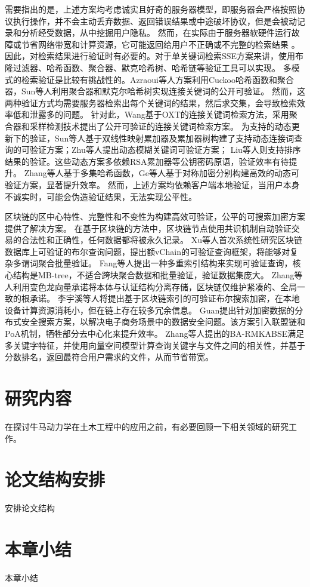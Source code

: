 需要指出的是，上述方案均考虑诚实且好奇的服务器模型，即服务器会严格按照协议执行操作，并不会主动丢弃数据、返回错误结果或中途破坏协议，但是会被动记录和分析经受数据，从中挖掘用户隐私。
然而，在实际由于服务器软硬件运行故障或节省网络带宽和计算资源，它可能返回给用户不正确或不完整的检索结果
。因此，对检索结果进行验证时有必要的。对于单关键词检索SSE方案来讲，使用布隆过滤器、哈希函数、聚合器、默克哈希树、哈希链等验证工具可以实现。
多模式的检索验证是比较有挑战性的。Azraoui等人方案利用Cuckoo哈希函数和聚合器，Sun等人利用聚合器和默克尔哈希树实现连接关键词的公开可验证。
然而，这两种验证方式均需要服务器检索出每个关键词的结果，然后求交集，会导致检索效率低和泄露多的问题。
针对此，Wang基于OXT的连接关键词检索方法，采用聚合器和采样检测技术提出了公开可验证的连接关键词检索方案。
为支持的动态更新下的验证，Sun等人基于双线性映射累加器及累加器树构建了支持动态连接词查询的可验证方案；Zhu等人提出动态模糊关键词可验证方案；
Liu等人则支持排序结果的验证。这些动态方案多依赖RSA累加器等公钥密码原语，验证效率有待提升。
Zhang等人基于多集哈希函数，Ge等人基于对称加密分别构建高效的动态可验证方案，显著提升效率。
然而，上述方案均依赖客户端本地验证，当用户本身不诚实时，可能会伪造验证结果，无法实现公平性。
   
区块链的区中心特性、完整性和不变性为构建高效可验证，公平的可搜索加密方案提供了解决方案。
在基于区块链的方法中，区块链节点使用共识机制自动验证交易的合法性和正确性，任何数据都将被永久记录。
Xu等人首次系统性研究区块链数据库上可验证的布尔查询问题，提出额vChain的可验证查询框架，将能够对复杂多谓词聚合批量验证。
Fang等人提出一种多重索引结构来实现可验证查询，核心结构是MB-tree，不适合跨块聚合数据和批量验证，验证数据集庞大。
Zhang等人利用变色龙向量承诺将本体与认证结构分离存储，区块链仅维护紧凑的、全局一致的根承诺。
李宇溪等人将提出基于区块链索引的可验证布尔搜索加密，在本地设备计算资源消耗小，但在链上存在较多冗余信息。
Guan提出针对加密数据的分布式安全搜索方案，以解决电子商务场景中的数据安全问题。该方案引入联盟链和PoA机制，牺牲部分去中心化来提升效率。
Zhang等人提出的BA-RMKABSE满足多关键字特征，并使用向量空间模型计算查询关键字与文件之间的相关性，并基于分数排名，返回最符合用户需求的文件，从而节省带宽。

\section{研究内容}
在探讨牛马动力学在土木工程中的应用之前，有必要回顾一下相关领域的研究工作。
\section{论文结构安排}
安排论文结构
\section{本章小结}
本章小结